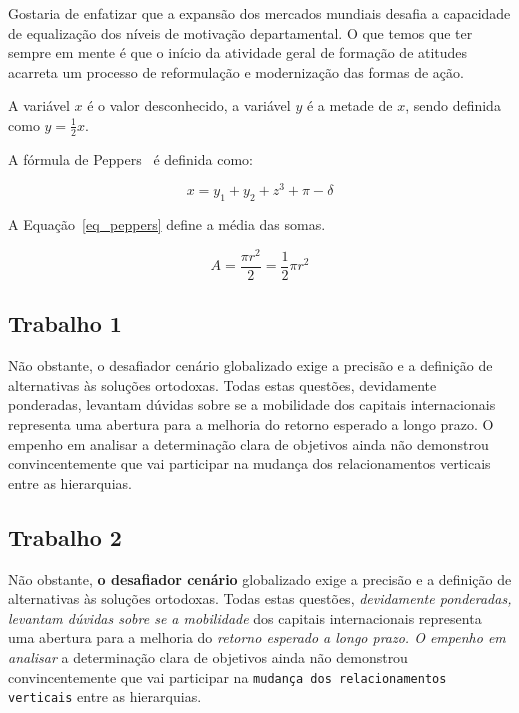 \documentclass{article}
\begin{document}
          Gostaria de enfatizar que a expansão dos mercados mundiais desafia a capacidade de equalização dos níveis de motivação departamental. O que temos que ter sempre em mente é que o início da atividade geral de formação de atitudes acarreta um processo de reformulação e modernização das formas de ação. 
          
A variável $x$ é o valor desconhecido, a variável $y$ é a metade de $x$, sendo definida como $y=\frac{1}{2}x$.

A fórmula de Peppers~\cite{berg2006logica} é definida como:

$$
  x = y_1 + y_2 + z^3 + \pi - \delta
$$

A Equação~\ref{eq_peppers} define a média das somas.

\begin{equation}\label{eq_peppers}
A = \frac{\pi r^2}{2} = \frac{1}{2} \pi r^2   
\end{equation} 
          
          
          
          
\subsection{Trabalho 1}          
          
Não obstante, o desafiador cenário globalizado exige a precisão e a definição de alternativas às soluções ortodoxas. Todas estas questões, devidamente ponderadas, levantam dúvidas sobre se a mobilidade dos capitais internacionais representa uma abertura para a melhoria do retorno esperado a longo prazo. O empenho em analisar a determinação clara de objetivos ainda não demonstrou convincentemente que vai participar na mudança dos relacionamentos verticais entre as hierarquias. 

\subsection{Trabalho 2}          
          
Não obstante, \textbf{o desafiador cenário} globalizado exige a precisão e a definição de alternativas às soluções ortodoxas. Todas estas questões, \textit{devidamente ponderadas, levantam dúvidas sobre se a mobilidade} dos capitais internacionais representa uma abertura para a melhoria do \emph{retorno esperado a longo prazo. O empenho em analisar} a determinação clara de objetivos ainda não demonstrou convincentemente que vai participar na \texttt{mudança dos relacionamentos verticais} entre as hierarquias. 
\end{document}
